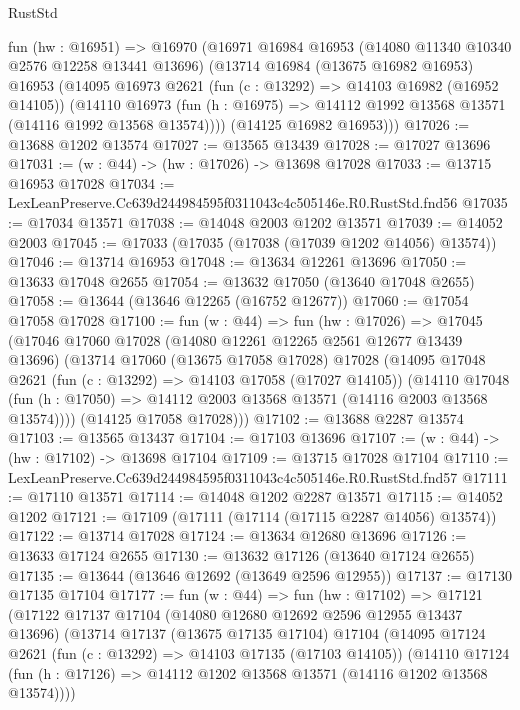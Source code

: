 \begin{lexlean}{RustStd}
\begin{coremodule}
  fun (hw : @16951) =>
  @16970
    (@16971
      @16984
      @16953
      (@14080 @11340 @10340 @2576 @12258 @13441 @13696)
      (@13714
        @16984
        (@13675 @16982 @16953)
        @16953
        (@14095
          @16973
          @2621
          (fun (c : @13292) => @14103 @16982 (@16952 @14105))
          (@14110
            @16973
            (fun (h : @16975) => @14112 @1992 @13568 @13571 (@14116 @1992 @13568 @13574))))
        (@14125 @16982 @16953)))
@17026 := @13688 @1202 @13574
@17027 := @13565 @13439
@17028 := @17027 @13696
@17031 := (w : @44) -> (hw : @17026) -> @13698 @17028
@17033 := @13715 @16953 @17028
@17034 := LexLeanPreserve.Cc639d244984595f0311043c4c505146e.R0.RustStd.fnd56
@17035 := @17034 @13571
@17038 := @14048 @2003 @1202 @13571
@17039 := @14052 @2003
@17045 := @17033 (@17035 (@17038 (@17039 @1202 @14056) @13574))
@17046 := @13714 @16953
@17048 := @13634 @12261 @13696
@17050 := @13633 @17048 @2655
@17054 := @13632 @17050 (@13640 @17048 @2655)
@17058 := @13644 (@13646 @12265 (@16752 @12677))
@17060 := @17054 @17058 @17028
@17100 := fun (w : @44) =>
  fun (hw : @17026) =>
  @17045
    (@17046
      @17060
      @17028
      (@14080 @12261 @12265 @2561 @12677 @13439 @13696)
      (@13714
        @17060
        (@13675 @17058 @17028)
        @17028
        (@14095
          @17048
          @2621
          (fun (c : @13292) => @14103 @17058 (@17027 @14105))
          (@14110
            @17048
            (fun (h : @17050) => @14112 @2003 @13568 @13571 (@14116 @2003 @13568 @13574))))
        (@14125 @17058 @17028)))
@17102 := @13688 @2287 @13574
@17103 := @13565 @13437
@17104 := @17103 @13696
@17107 := (w : @44) -> (hw : @17102) -> @13698 @17104
@17109 := @13715 @17028 @17104
@17110 := LexLeanPreserve.Cc639d244984595f0311043c4c505146e.R0.RustStd.fnd57
@17111 := @17110 @13571
@17114 := @14048 @1202 @2287 @13571
@17115 := @14052 @1202
@17121 := @17109 (@17111 (@17114 (@17115 @2287 @14056) @13574))
@17122 := @13714 @17028
@17124 := @13634 @12680 @13696
@17126 := @13633 @17124 @2655
@17130 := @13632 @17126 (@13640 @17124 @2655)
@17135 := @13644 (@13646 @12692 (@13649 @2596 @12955))
@17137 := @17130 @17135 @17104
@17177 := fun (w : @44) =>
  fun (hw : @17102) =>
  @17121
    (@17122
      @17137
      @17104
      (@14080 @12680 @12692 @2596 @12955 @13437 @13696)
      (@13714
        @17137
        (@13675 @17135 @17104)
        @17104
        (@14095
          @17124
          @2621
          (fun (c : @13292) => @14103 @17135 (@17103 @14105))
          (@14110
            @17124
            (fun (h : @17126) => @14112 @1202 @13568 @13571 (@14116 @1202 @13568 @13574))))

\end{coremodule}
\end{lexlean}
